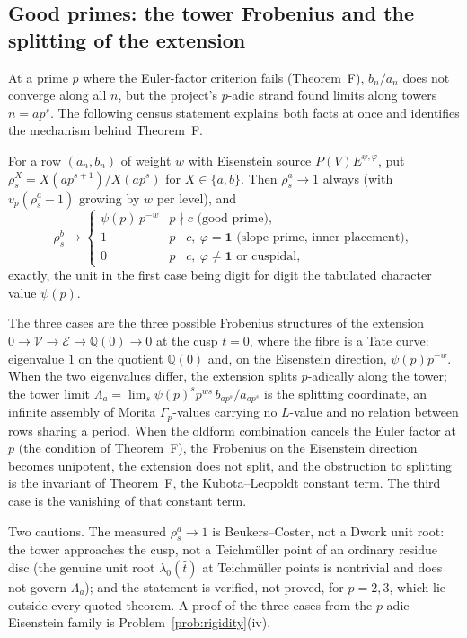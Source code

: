 \subsection{Good primes: the tower Frobenius and the splitting of the extension}\label{sec:goodprimes}

At a prime $p$ where the Euler-factor criterion fails (Theorem~F), $b_n/a_n$ does not converge along all $n$, but the project's $p$-adic strand \cite{ProjTheory03} found limits along towers $n=ap^s$. The following census statement explains both facts at once and identifies the mechanism behind Theorem~F.

\begin{observation}\label{obs:tower}
For a row $(a_n,b_n)$ of weight $w$ with Eisenstein source $P(V)E^{\psi,\varphi}$, put $\rho^X_s=X(ap^{s+1})/X(ap^s)$ for $X\in\{a,b\}$. Then $\rho^a_s\to1$ always \textup{(}with $v_p(\rho^a_s-1)$ growing by $w$ per level\textup{)}, and
\[
\rho^b_s\longrightarrow
\begin{cases}
\psi(p)\,p^{-w} & p\nmid c \text{ (good prime)},\\
1 & p\mid c,\ \varphi=\mathbf 1 \text{ (slope prime, inner placement)},\\
0 & p\mid c,\ \varphi\neq\mathbf 1 \text{ or cuspidal},
\end{cases}
\]
exactly, the unit in the first case being digit for digit the tabulated character value $\psi(p)$.
\end{observation}

The three cases are the three possible Frobenius structures of the extension $0\to\mathcal V\to\mathcal E\to\mathbb Q(0)\to0$ at the cusp $t=0$, where the fibre is a Tate curve: eigenvalue $1$ on the quotient $\mathbb Q(0)$ and, on the Eisenstein direction, $\psi(p)p^{-w}$. When the two eigenvalues differ, the extension splits $p$-adically along the tower; the tower limit $\Lambda_a=\lim_s\psi(p)^sp^{ws}\,b_{ap^s}/a_{ap^s}$ is the splitting coordinate, an infinite assembly of Morita $\Gamma_p$-values \cite{ProjTheory03} carrying no $L$-value and no relation between rows sharing a period. When the oldform combination cancels the Euler factor at $p$ (the condition of Theorem~F), the Frobenius on the Eisenstein direction becomes unipotent, the extension does not split, and the obstruction to splitting is the invariant of Theorem~F, the Kubota--Leopoldt constant term. The third case is the vanishing of that constant term.

Two cautions. The measured $\rho^a_s\to1$ is Beukers--Coster, not a Dwork unit root: the tower approaches the cusp, not a Teichm\"uller point of an ordinary residue disc (the genuine unit root $\lambda_0(\hat t)$ at Teichm\"uller points is nontrivial and does not govern $\Lambda_a$); and the statement is verified, not proved, for $p=2,3$, which lie outside every quoted theorem. A proof of the three cases from the $p$-adic Eisenstein family is Problem~\ref{prob:rigidity}(iv).
